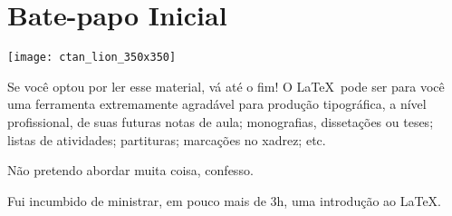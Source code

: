 \thispagestyle{empty}

\section*{Bate-papo Inicial}

\begin{marginfigure}
  \centering
  \texttt{[image: ctan\_lion\_350x350]}
\end{marginfigure}

Se você optou por ler esse material, vá até o fim!
O \LaTeX\ pode ser para você uma ferramenta extremamente agradável para produção
tipográfica, a nível profissional, de suas futuras notas de aula; monografias,
dissetações ou teses; listas de atividades; partituras; marcações no xadrez; etc.

Não pretendo abordar muita coisa, confesso.

Fui incumbido de ministrar, em pouco mais de 3\unit{\hour}, uma introdução ao 
\LaTeX.


\newpage